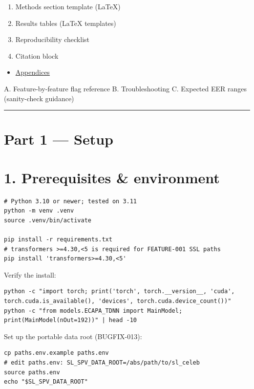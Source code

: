 \documentclass[10pt,a4paper]{article}
\begin{document}
\begin{enumerate}[leftmargin=*,itemsep=2pt]
  \item Methods section template (LaTeX)
  \item Results tables (LaTeX templates)
  \item Reproducibility checklist
  \item Citation block
\end{enumerate}
\begin{itemize}[leftmargin=*,itemsep=2pt]
  \item \href{\#appendices}{Appendices}
\end{itemize}
A. Feature-by-feature flag reference B. Troubleshooting C. Expected EER ranges (sanity-check guidance)

\vspace{0.5em}\hrule\vspace{0.5em}

\section*{Part 1 --- Setup}

\section*{1. Prerequisites \& environment}


\begin{Verbatim}[fontsize=\small,frame=single,framesep=4pt]
# Python 3.10 or newer; tested on 3.11
python -m venv .venv
source .venv/bin/activate

pip install -r requirements.txt
# transformers >=4.30,<5 is required for FEATURE-001 SSL paths
pip install 'transformers>=4.30,<5'
\end{Verbatim}


Verify the install:

\begin{Verbatim}[fontsize=\small,frame=single,framesep=4pt]
python -c "import torch; print('torch', torch.__version__, 'cuda', torch.cuda.is_available(), 'devices', torch.cuda.device_count())"
python -c "from models.ECAPA_TDNN import MainModel; print(MainModel(nOut=192))" | head -10
\end{Verbatim}


Set up the portable data root (BUGFIX-013):

\begin{Verbatim}[fontsize=\small,frame=single,framesep=4pt]
cp paths.env.example paths.env
# edit paths.env: SL_SPV_DATA_ROOT=/abs/path/to/sl_celeb
source paths.env
echo "$SL_SPV_DATA_ROOT"
\end{Verbatim}
\end{document}
